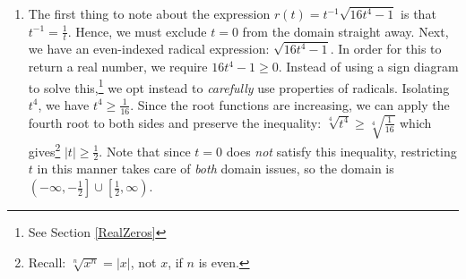 \documentclass{ximera}
\begin{document}
\begin{example}
\begin{enumerate}
\begin{center}
\end{center}

From the graph, we see the range of $h$ appears to be $(-3,3)$.  Attempting to solve $h(x) = \frac{3x}{\sqrt{x^2 + 1}} = -3$ or  $h(x) = \frac{3x}{\sqrt{x^2 + 1}} = 3$ gives, in either case, $9x^2 = 9(x^2+1)$ which reduces to $0 = 9$, a contradiction.  Hence, the graph of $y = h(x)$ never reaches its horizontal asymptotes. Moreover, $h$ appears to be always increasing, with no local extrema or `unusual' steepness.  One last remark:  it appears as if the graph of $h$ is symmetric about the origin.  We check $h(-x) = \frac{3(-x)}{\sqrt{(-x)^2+1}} = - \frac{3x}{\sqrt{x^2 + 1}} = -h(x)$ which verifies $h$ is odd.

\smallskip

Since the domain of $h$ is all real number and the only zero of $h$ is $x=0$, the sign diagram for $h(x)$ is fairly straight forward.  For $x<0$, $h(x)<0$ or $(-)$ and for $x>0$, $h(x) >0$ or $(+)$.  The sign diagram for $h(x)$ is below.

\begin{center}

% 

\end{center} 



\item  The first thing to note about the expression  $r(t) = t^{-1} \sqrt{16t^4-1}$ is that $t^{-1} = \frac{1}{t}$.  Hence, we must exclude $t=0$ from the domain straight away. Next, we have an even-indexed radical expression: $\sqrt{16t^4-1}$.  In order for this to return a real number, we require  $16t^4-1 \geq 0$.  Instead of using a sign diagram to solve this,\footnote{See Section \ref{RealZeros}} we opt instead to  \textit{carefully} use properties of radicals.  Isolating $t^4$, we have $t^4 \geq \frac{1}{16}$.  Since the root functions are increasing, we can apply the fourth root to both sides and preserve the inequality:  $\sqrt[4]{t^4} \geq \sqrt[4]{\frac{1}{16}}$ which gives\footnote{Recall: $\sqrt[n]{x^n} = |x|$, not $x$,  if $n$ is even.} $|t| \geq \frac{1}{2}$. Note that since $t =0$ does \textit{not} satisfy this inequality, restricting $t$ in this manner takes care of  \textit{both} domain issues, so the domain is  $\left(-\infty, -\frac{1}{2} \right] \cup \left[\frac{1}{2}, \infty \right)$.   


\end{enumerate}
\end{example}
\end{document}
